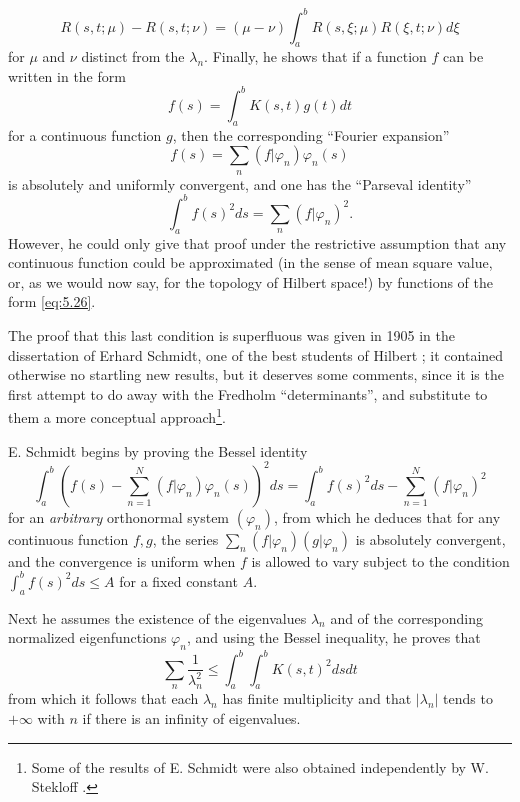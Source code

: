 \documentclass[12pt,a4paper,leqno,twoside]{extbook}
\begin{document}
\begin{equation}
    \label{eq:5.25}
    R(s, t; \mu) - R(s, t; \nu) = (\mu-\nu) \int_a^b R(s, \xi; \mu) R(\xi, t; \nu)d\xi
\end{equation}
for \(\mu\) and \(\nu\) distinct from the \(\lambda_n\). Finally, he shows that if a function \(f\) can be written in the form
\begin{equation}
    \label{eq:5.26}
    f(s) = \int_a^b K(s, t)g(t)dt
\end{equation}
for a continuous function \(g\), then the corresponding ``Fourier expansion''
\begin{equation}
    \label{eq:5.27}
    f(s) = \sum_n (f|\varphi_n)\varphi_n(s)
\end{equation}
is absolutely and uniformly convergent, and one has the ``Parseval identity''
\begin{equation}
    \label{eq:5.28}
    \int_a^b f(s)^2ds = \sum_n (f|\varphi_n)^2.
\end{equation}
However, he could only give that proof under the restrictive assumption that any continuous function could be approximated (in the sense of mean square value, or, as we would now say, for the topology of Hilbert space!) by functions of the form \eqref{eq:5.26}.

The proof that this last condition is superfluous was given in 1905 in the dissertation of Erhard Schmidt, one of the best students of Hilbert \cite{191}; it contained otherwise no startling new results, but it deserves some comments, since it is the first attempt to do away with the Fredholm ``determinants'', and substitute to them a more conceptual approach\footnote{Some of the results of E. Schmidt were also obtained independently by W. Stekloff \cite{204}.}.

E. Schmidt begins by proving the Bessel identity
\begin{equation}
    \label{eq:5.29}
    \int_a^b \left( f(s) - \sum_{n=1}^N (f|\varphi_n)\varphi_n(s) \right)^2 ds = \int_a^b f(s)^2 ds - \sum_{n=1}^N (f|\varphi_n)^2
\end{equation}
for an \emph{arbitrary} orthonormal system \((\varphi_n)\), from which he deduces that for any continuous function \(f, g\), the series \(\sum\limits_n (f|\varphi_n)(g|\varphi_n)\) is absolutely convergent, and the convergence is uniform when \(f\) is allowed to vary subject to the condition \(\int_a^b f(s)^2 ds \leq A\) for a fixed constant \(A\).

Next he assumes the existence of the eigenvalues \(\lambda_n\) and of the corresponding normalized eigenfunctions \(\varphi_n\), and using the Bessel inequality, he proves that
\begin{equation}
    \label{eq:5.30}
    \sum_n \frac{1}{\lambda_n^2} \leq \int_a^b \int_a^b K(s,t)^2 dsdt
\end{equation}
from which it follows that each \(\lambda_n\) has finite multiplicity and that \(|\lambda_n|\) tends to \(+\infty\) with \(n\) if there is an infinity of eigenvalues.
\end{document}
